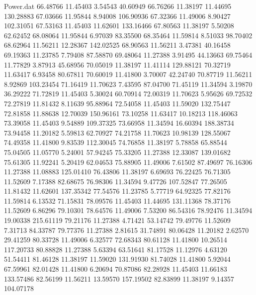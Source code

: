\begin{filecontents}{Power.dat}
  66.48766   11.45403    3.54543   40.60949
  66.76266   11.38197   11.44695  130.28883
  67.03666   11.95844    8.94008  106.90936
  67.32366   11.49006    8.90427  102.31051
  67.53163   11.45403   11.62601  133.16466
  67.80563   11.38197    5.50208   62.62452
  68.08064   11.95844    6.97039   83.35500
  68.35464   11.59814    8.51033   98.70402
  68.62964   11.56211   12.28367  142.02525
  68.90563   11.56211    3.47381   40.16458
  69.19363   11.23785    7.79408   87.58870
  69.48064   11.27388    3.91495   44.13663
  69.75464   11.77829    3.87913   45.68956
  70.05019   11.38197   11.41114  129.88121
  70.32719   11.63417    6.93458   80.67811
  70.60019   11.41800    3.70007   42.24740
  70.87719   11.56211    8.92869  103.23454
  71.16419   11.70623    7.43595   87.04700
  71.45119   11.34594    3.19870   36.29222
  71.72819   11.45403    5.30024   60.70914
  72.00319   11.70623    5.95626   69.72532
  72.27819   11.81432    8.11639   95.88964
  72.54058   11.45403   11.59020  132.75447
  72.81858   11.88638   12.70039  150.96161
  73.10258   11.63417   10.18213  118.46063
  73.39058   11.45403    9.54889  109.37325
  73.66958   11.34594   16.60394  188.38734
  73.94458   11.20182    5.59813   62.70927
  74.21758   11.70623   10.98139  128.55067
  74.49358   11.41800    9.83539  112.30045
  74.76858   11.38197    5.78858   65.88544
  75.04505   11.05770    5.24001   57.94245
  75.33205   11.27388   12.33087  139.01682
  75.61305   11.92241    5.20419   62.04653
  75.88905   11.49006    7.61502   87.49697
  76.16306   11.27388   11.08883  125.01410
  76.43806   11.38197    6.69693   76.22425
  76.71305   11.52609    7.17388   82.68675
  76.98306   11.34594    9.47726  107.52847
  77.26505   11.81432   11.62601  137.35342
  77.54576   11.23785    5.77719   64.92325
  77.82176   11.59814    6.13532   71.15831
  78.09576   11.45403   11.44695  131.11368
  78.37176   11.52609    6.86296   79.10301
  78.64576   11.49006    7.53200   86.54316
  78.92476   11.34594   19.00338  215.61119
  79.21176   11.27388    4.71421   53.14742
  79.49776   11.52609    7.31713   84.33787
  79.77376   11.27388    2.81615   31.74891
  80.06428   11.20182    2.62570   29.41259
  80.33728   11.49006    6.32577   72.68343
  80.61128   11.41800   10.26514  117.20733
  80.88828   11.27388    5.63394   63.51641
  81.17528   11.12976    4.63120   51.54411
  81.46128   11.38197   11.59020  131.91930
  81.74028   11.41800    5.92044   67.59961
  82.01428   11.41800    6.20694   70.87086
  82.28928   11.45403   11.66183  133.57486
  82.56199   11.56211   13.59570  157.19502
  82.83899   11.38197    9.14357  104.07178

\end{filecontents}
